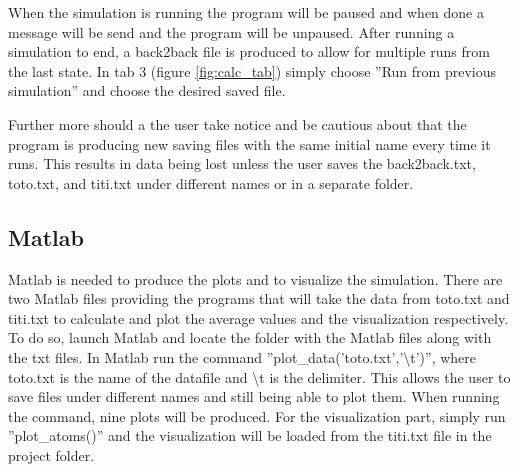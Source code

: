 When the simulation is running the program will be paused and when done a message will be send and the program will be unpaused. After running a simulation to end, a back2back file is produced to allow for multiple runs from the last state. In tab 3 (figure \ref{fig:calc_tab}) simply choose ''Run from previous simulation'' and choose the desired saved file.

Further more should a the user take notice and be cautious about that the program is producing new saving files with the same initial name every time it runs. This results in data being lost unless the user saves the back2back.txt, toto.txt, and titi.txt under different names or in a separate folder.

\subsection{Matlab}
Matlab is needed to produce the plots and to visualize the simulation. There are two Matlab files providing the programs that will take the data from toto.txt and titi.txt to calculate and plot the average values and the visualization respectively. To do so, launch Matlab and locate the folder with the Matlab files along with the txt files. In Matlab run the command ''plot\_data('toto.txt','\textbackslash{}t')'', where toto.txt is the name of the datafile and \textbackslash{}t is the delimiter. This allows the user to save files under different names and still being able to plot them. When running the command, nine plots will be produced. For the visualization part, simply run ''plot\_atoms()'' and the visualization will be loaded from the titi.txt file in the project folder.